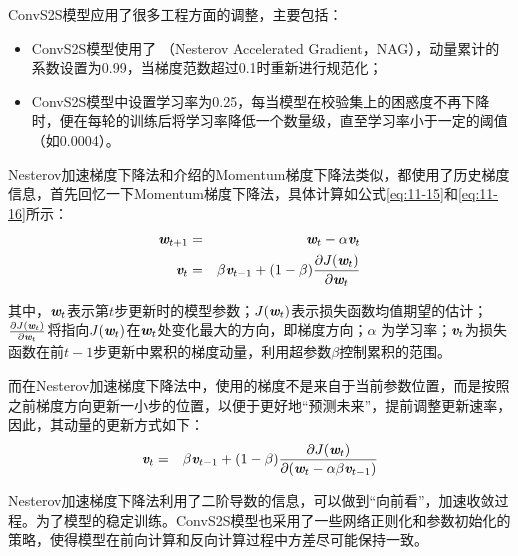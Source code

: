 \parinterval ConvS2S模型应用了很多工程方面的调整，主要包括：
\begin{itemize}
\vspace{0.5em}
\item ConvS2S模型使用了{\small{}} （Nesterov Accelerated Gradient，NAG），动量累计的系数设置为0.99，当梯度范数超过0.1时重新进行规范化；

\vspace{0.5em}
\item ConvS2S模型中设置学习率为0.25，每当模型在校验集上的困惑度不再下降时，便在每轮的训练后将学习率降低一个数量级，直至学习率小于一定的阈值（如0.0004）。
\vspace{0.5em}

\end{itemize}

\parinterval Nesterov加速梯度下降法和{\chapternine}介绍的Momentum梯度下降法类似，都使用了历史梯度信息，首先回忆一下Momentum梯度下降法，具体计算如公式\eqref{eq:11-15}和\eqref{eq:11-16}所示：
\begin{eqnarray}
\textbf{\em w}_{t+1} & = &  \textbf{\em w}_t - \alpha \textbf{\em v}_t \label{eq:11-15} \\
\textbf{\em v}_t & = & \beta \textbf{\em v}_{t-1} + (1-\beta)\frac{\partial J(\textbf{\em w}_t)}{\partial \textbf{\em w}_t}  \label{eq:11-16}
\end{eqnarray}

\noindent 其中，$\textbf{\em w}_t$表示第$t$步更新时的模型参数；$J(\textbf{\em w}_t)$表示损失函数均值期望的估计；$\frac{\partial J(\textbf{\em w}_t)}{\partial \textbf{\em w}_t}$将指向$J(\textbf{\em w}_t)$在$\textbf{\em w}_t$处变化最大的方向，即梯度方向；$\alpha$ 为学习率；$\textbf{\em v}_t$为损失函数在前$t-1$步更新中累积的梯度动量，利用超参数$\beta$控制累积的范围。

\parinterval 而在Nesterov加速梯度下降法中，使用的梯度不是来自于当前参数位置，而是按照之前梯度方向更新一小步的位置，以便于更好地“预测未来”，提前调整更新速率，因此，其动量的更新方式如下：
\begin{eqnarray}
\textbf{\em v}_t & = & \beta \textbf{\em v}_{t-1} + (1-\beta)\frac{\partial J(\textbf{\em w}_t)}{\partial (\textbf{\em w}_{t} -\alpha \beta \textbf{\em v}_{t-1} )}
\label{eq:11-17}
\end{eqnarray}

\parinterval Nesterov加速梯度下降法利用了二阶导数的信息，可以做到“向前看”，加速收敛过程。为了模型的稳定训练。ConvS2S模型也采用了一些网络正则化和参数初始化的策略，使得模型在前向计算和反向计算过程中方差尽可能保持一致。

